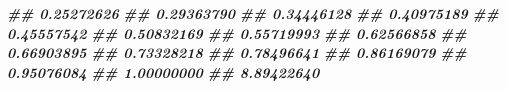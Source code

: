 \documentclass[10pt,landscape,a3paper]{article}
\newenvironment{Shaded}{\begin{snugshade}}{\end{snugshade}}
\newcommand{\DocumentationTok}[1]{\textcolor[rgb]{0.56,0.35,0.01}{\textbf{\textit{#1}}}}
\begin{document}
\begin{Shaded}
\begin{Highlighting}[]
\DocumentationTok{\#\#                                      0.25272626}
\DocumentationTok{\#\#                                      0.29363790}
\DocumentationTok{\#\#                                      0.34446128}
\DocumentationTok{\#\#                                      0.40975189}
\DocumentationTok{\#\#                                      0.45557542}
\DocumentationTok{\#\#                                      0.50832169}
\DocumentationTok{\#\#                                      0.55719993}
\DocumentationTok{\#\#                                      0.62566858}
\DocumentationTok{\#\#                                      0.66903895}
\DocumentationTok{\#\#                                      0.73328218}
\DocumentationTok{\#\#                                      0.78496641}
\DocumentationTok{\#\#                                      0.86169079}
\DocumentationTok{\#\#                                      0.95076084}
\DocumentationTok{\#\#                                      1.00000000}
\DocumentationTok{\#\#                                      8.89422640}


\end{Highlighting}
\end{Shaded}
\end{document}

